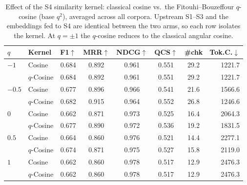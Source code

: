 \begin{table}[t]\centering
\caption{Effect of the S4 similarity kernel: classical cosine vs.\ the Fitouhi--Bouzeffour $q$-cosine (base $q^{2}$), averaged across all corpora. Upstream S1--S3 and the embeddings fed to S4 are identical between the two arms, so each row isolates the kernel. At $q=\pm1$ the $q$-cosine reduces to the classical angular cosine.}
\label{tab:s4kernel}
\begin{tabular}{@{}llcccccr@{}}\toprule
$q$ & Kernel & F1$\uparrow$ & MRR$\uparrow$ & NDCG$\uparrow$ & QCS$\uparrow$ & \#chk & Tok.C.$\downarrow$ \\\midrule
$-1$ & Cosine & 0.684 & 0.892 & 0.961 & 0.551 & 29.2 & 1221.7 \\
 & $q$-Cosine & 0.684 & 0.892 & 0.961 & 0.551 & 29.2 & 1221.7 \\
\midrule
$-0.5$ & Cosine & 0.677 & 0.896 & 0.966 & 0.541 & 21.6 & 1566.6 \\
 & $q$-Cosine & 0.682 & 0.915 & 0.964 & 0.552 & 26.8 & 1246.6 \\
\midrule
$0$ & Cosine & 0.662 & 0.871 & 0.973 & 0.525 & 16.4 & 2064.3 \\
 & $q$-Cosine & 0.677 & 0.890 & 0.972 & 0.536 & 19.2 & 1831.5 \\
\midrule
$0.5$ & Cosine & 0.664 & 0.860 & 0.976 & 0.521 & 14.4 & 2277.1 \\
 & $q$-Cosine & 0.674 & 0.871 & 0.975 & 0.527 & 15.8 & 2119.0 \\
\midrule
$1$ & Cosine & 0.662 & 0.860 & 0.978 & 0.517 & 12.9 & 2476.3 \\
 & $q$-Cosine & 0.662 & 0.860 & 0.978 & 0.517 & 12.9 & 2476.3 \\
\bottomrule\end{tabular}\end{table}
